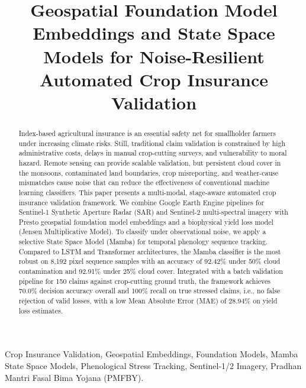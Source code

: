 \documentclass[conference]{IEEEtran}
\begin{document}
\title{Geospatial Foundation Model Embeddings and State Space Models for Noise-Resilient Automated Crop Insurance Validation}

\author{
}

\maketitle

\begin{abstract}
Index-based agricultural insurance is an essential safety net for smallholder farmers under increasing climate risks. Still, traditional claim validation is constrained by high administrative costs, delays in manual crop-cutting surveys, and vulnerability to moral hazard. Remote sensing can provide scalable validation, but persistent cloud cover in the monsoons, contaminated land boundaries, crop misreporting, and weather-cause mismatches cause noise that can reduce the effectiveness of conventional machine learning classifiers. This paper presents a multi-modal, stage-aware automated crop insurance validation framework. We combine Google Earth Engine pipelines for Sentinel-1 Synthetic Aperture Radar (SAR) and Sentinel-2 multi-spectral imagery with Presto geospatial foundation model embeddings and a biophysical yield loss model (Jensen Multiplicative Model). To classify under observational noise, we apply a selective State Space Model (Mamba) for temporal phenology sequence tracking. Compared to LSTM and Transformer architectures, the Mamba classifier is the most robust on 8,192 pixel sequence samples with an accuracy of 92.42\% under 50\% cloud contamination and 92.91\% under 25\% cloud cover. Integrated with a batch validation pipeline for 150 claims against crop-cutting ground truth, the framework achieves 70.0\% decision accuracy overall and 100\% recall on true stressed claims, i.e., no false rejection of valid losses, with a low Mean Absolute Error (MAE) of 28.94\% on yield loss estimates.
\end{abstract}

\begin{IEEEkeywords}
Crop Insurance Validation, Geospatial Embeddings, Foundation Models, Mamba State Space Models, Phenological Stress Tracking, Sentinel-1/2 Imagery, Pradhan Mantri Fasal Bima Yojana (PMFBY).
\end{IEEEkeywords}
\end{document}
